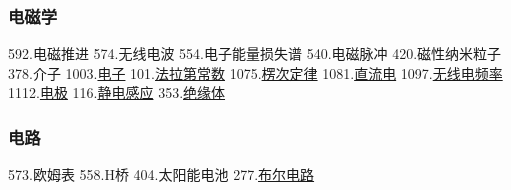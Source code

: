 \subsubsection{电磁学}
592.电磁推进
574.无线电波
554.电子能量损失谱
540.电磁脉冲
420.磁性纳米粒子
378.介子
1003.\href{https://wuli.wiki/assets/sogou/1003.\%E7\%94\%B5\%E5\%AD\%90\%20-\%20\%E6\%90\%9C\%E7\%8B\%97\%E7\%A7\%91\%E5\%AD\%A6\%E7\%99\%BE\%E7\%A7\%91.html}{电子}
101.\href{https://wuli.wiki/assets/sogou/101.\%E6\%B3\%95\%E6\%8B\%89\%E7\%AC\%AC\%E5\%B8\%B8\%E6\%95\%B0\%20-\%20\%E6\%90\%9C\%E7\%8B\%97\%E7\%A7\%91\%E5\%AD\%A6\%E7\%99\%BE\%E7\%A7\%91.html}{法拉第常数}
1075.\href{https://wuli.wiki/assets/sogou/1075.\%E6\%A5\%9E\%E6\%AC\%A1\%E5\%AE\%9A\%E5\%BE\%8B\%20-\%20\%E6\%90\%9C\%E7\%8B\%97\%E7\%A7\%91\%E5\%AD\%A6\%E7\%99\%BE\%E7\%A7\%91.html}{楞次定律}
1081.\href{https://wuli.wiki/assets/sogou/1081.\%E7\%9B\%B4\%E6\%B5\%81\%E7\%94\%B5\%20-\%20\%E6\%90\%9C\%E7\%8B\%97\%E7\%A7\%91\%E5\%AD\%A6\%E7\%99\%BE\%E7\%A7\%91.html}{直流电}
1097.\href{https://wuli.wiki/assets/sogou/1097.\%E6\%97\%A0\%E7\%BA\%BF\%E7\%94\%B5\%E9\%A2\%91\%E7\%8E\%87\%20-\%20\%E6\%90\%9C\%E7\%8B\%97\%E7\%A7\%91\%E5\%AD\%A6\%E7\%99\%BE\%E7\%A7\%91.html}{无线电频率}
1112.\href{https://wuli.wiki/assets/sogou/1112.\%E7\%94\%B5\%E6\%9E\%81\%20-\%20\%E6\%90\%9C\%E7\%8B\%97\%E7\%A7\%91\%E5\%AD\%A6\%E7\%99\%BE\%E7\%A7\%91.html}{电极}
116.\href{https://wuli.wiki/assets/sogou/116.\%E9\%9D\%99\%E7\%94\%B5\%E6\%84\%9F\%E5\%BA\%94\%20-\%20\%E6\%90\%9C\%E7\%8B\%97\%E7\%A7\%91\%E5\%AD\%A6\%E7\%99\%BE\%E7\%A7\%91.html}{静电感应}
353.\href{https://wuli.wiki/assets/sogou/353.\%E7\%BB\%9D\%E7\%BC\%98\%E4\%BD\%93\%20-\%20\%E6\%90\%9C\%E7\%8B\%97\%E7\%A7\%91\%E5\%AD\%A6\%E7\%99\%BE\%E7\%A7\%91.html}{绝缘体}
\subsubsection{电路}
573.欧姆表
558.H桥
404.太阳能电池
277.\href{https://wuli.wiki/assets/sogou/277.\%E5\%B8\%83\%E5\%B0\%94\%E7\%94\%B5\%E8\%B7\%AF\%20-\%20\%E6\%90\%9C\%E7\%8B\%97\%E7\%A7\%91\%E5\%AD\%A6\%E7\%99\%BE\%E7\%A7\%91.html}{布尔电路}
